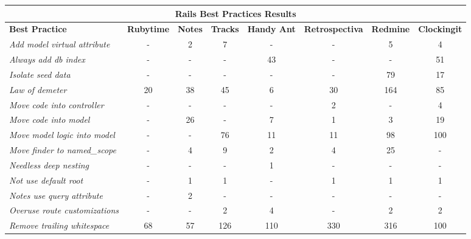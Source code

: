 \documentclass[sle]{llncs}
\begin{document}
\begin{table}[H]
\begin{center}
{\scriptsize
\begin{threeparttable}
\begin{tabular}{|l||c|c|c|c|c|c|c|} \hline 
\multicolumn{8}{|c|}{Rails Best Practices Results} \\ \hline 
\textbf{Best Practice}& \textbf{Rubytime}& \textbf{Notes}& \textbf{Tracks}&  \textbf{Handy Ant}& \textbf{Retrospectiva}& \textbf{Redmine}& \textbf{Clockingit} \\\hline\hline
\emph{Add model virtual attribute           }              &   -  &   2  &   7  &   - &   - &   5 &   4  \\ \hline 
\emph{Always add db index                   }              &   -  &   -  &   -  &  43 &   - &   - &  51  \\ \hline 
\emph{Isolate seed data                     }              &   -  &   -  &   -  &   - &   - &  79 &  17  \\ \hline 
\emph{Law of demeter                        }              &  20  &  38  &  45  &   6 &  30 & 164 &  85  \\ \hline  
\emph{Move code into controller             }              &   -  &   -  &   -  &   - &   2 &   - &   4  \\ \hline 
\emph{Move code into model                  }              &   -  &  26  &   -  &   7 &   1 &   3 &  19  \\ \hline  
\emph{Move model logic into model           }              &   -  &   -  &  76  &  11 &  11 &  98 & 100  \\ \hline  
\emph{Move finder to named\_scope           }              &   -  &   4  &   9  &   2 &   4 &  25 &   -  \\ \hline  
\emph{Needless deep nesting                 }              &   -  &   -  &   -  &   1 &   - &   - &   -  \\ \hline  
\emph{Not use default root                  }              &   -  &   1  &   1  &   - &   1 &   1 &   1  \\ \hline 
\emph{Notes  use query attribute            }              &   -  &   2  &   -  &   - &   - &   - &   -  \\ \hline
\emph{Overuse route customizations          }              &   -  &   -  &   2  &   4 &   - &   2 &   2  \\ \hline   
\emph{Remove trailing whitespace            }              &  68  &  57  & 126  & 110 & 330 & 316 & 100  \\ \hline 

\end{tabular}
\end{threeparttable}}
\end{center}
\end{table}
\end{document}
